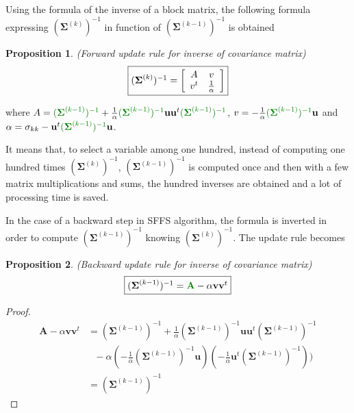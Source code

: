 \documentclass[journal,peerreview,onecolumn]{IEEEtran}
\newtheorem{prop}{Proposition}
\begin{document}
        Using the formula of the inverse of a block matrix, the following formula expressing $(\boldsymbol{\Sigma}^{(k)})^{-1}$ in function of $(\boldsymbol{\Sigma}^{(k-1)})^{-1}$ is obtained
        \begin{prop}
        \label{eq:update-inv}
            (Forward update rule for inverse of covariance matrix)
            \begin{equation*}
                \fbox{$
                (\boldsymbol{\Sigma}^{(k)})^{-1} =
                \bigg[\begin{array}{cc}
                A & v \\
                v^t  & \frac{1}{\alpha} \\
                \end{array}\bigg]
                $}
            \end{equation*}
        \end{prop}
        where $A = \textcolor[rgb]{0,0.5,0}{(\boldsymbol{\Sigma}^{(k-1)})^{-1}} + \frac{1}{\alpha} \textcolor[rgb]{0,0.5,0}{(\boldsymbol{\Sigma}^{(k-1)})^{-1}} \mathbf{u} \mathbf{u}^t \textcolor[rgb]{0,0.5,0}{(\boldsymbol{\Sigma}^{(k-1)})^{-1}}$, $v = - \frac{1}{\alpha} \textcolor[rgb]{0,0.5,0}{(\boldsymbol{\Sigma}^{(k-1)})^{-1}} \mathbf{u}$ and $ \alpha = \sigma_{kk} - \mathbf{u}^t \textcolor[rgb]{0,0.5,0}{(\boldsymbol{\Sigma}^{(k-1)})^{-1}} \mathbf{u} $.

        It means that, to select a variable among one hundred, instead of computing one hundred times $(\boldsymbol{\Sigma}^{(k)})^{-1}$, $(\boldsymbol{\Sigma}^{(k-1)})^{-1}$ is computed once and then with a few matrix multiplications and sums, the hundred inverses are obtained and a lot of processing time is saved.

        In the case of a backward step in SFFS algorithm, the formula is inverted in order to compute $(\boldsymbol{\Sigma}^{(k-1)})^{-1}$ knowing $(\boldsymbol{\Sigma}^{(k)})^{-1}$. The update rule becomes
        \begin{prop}
            (Backward update rule for inverse of covariance matrix)
            \begin{equation*}
                \fbox{$(\boldsymbol{\Sigma}^{(k-1)})^{-1} = \textcolor[rgb]{0,0.5,0}{\mathbf{A}} - \alpha \mathbf{v} \mathbf{v}^t$}
            \end{equation*}
        \end{prop}

        \begin{proof}
            \begin{align*}
                \mathbf{A} - \alpha \mathbf{v} \mathbf{v}^t
                &= (\boldsymbol{\Sigma}^{(k-1)})^{-1} + \frac{1}{\alpha} (\boldsymbol{\Sigma}^{(k-1)})^{-1} \mathbf{u} \mathbf{u}^t (\boldsymbol{\Sigma}^{(k-1)})^{-1} \\
                &~~~- \alpha (- \frac{1}{\alpha} (\boldsymbol{\Sigma}^{(k-1)})^{-1} \mathbf{u}) (- \frac{1}{\alpha} \mathbf{u}^t (\boldsymbol{\Sigma}^{(k-1)})^{-1})) \\
                &= (\boldsymbol{\Sigma}^{(k-1)})^{-1}
            \end{align*}
        \end{proof}
\end{document}
